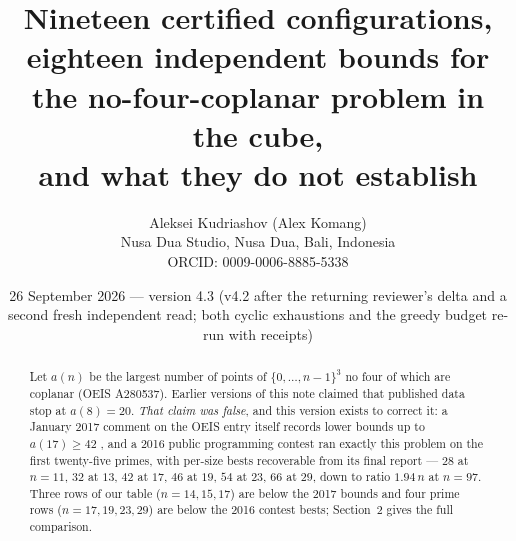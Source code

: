 \documentclass[11pt,a4paper]{article}
\title{Nineteen certified configurations, eighteen independent bounds for the no-four-coplanar problem in the cube,\\
and what they do not establish}
\author{Aleksei Kudriashov (Alex Komang)\\ \small Nusa Dua Studio, Nusa Dua, Bali, Indonesia\\ \small ORCID: 0009-0006-8885-5338}
\date{26 September 2026 --- version 4.3 (v4.2 after the returning reviewer's delta and a second fresh independent read; both cyclic exhaustions and the greedy budget re-run with receipts)}
\begin{document}
\maketitle
\begin{abstract}
Let $a(n)$ be the largest number of points of $\{0,\dots,n-1\}^3$ no four of which are coplanar
(OEIS A280537).  Earlier versions of this note claimed that published data stop at $a(8)=20$.
\emph{That claim was false}, and this version exists to correct it: a January 2017 comment on
the OEIS entry itself records lower bounds up to $a(17)\ge42$ \cite{OEISA280537}, and a 2016
public programming contest ran exactly this problem on the first twenty-five primes, with
per-size bests recoverable from its final report \cite{AZsPCs} --- $28$ at $n=11$, $32$ at $13$,
$42$ at $17$, $46$ at $19$, $54$ at $23$, $66$ at $29$, down to ratio $1.94\,n$ at $n=97$.
Three rows of our table ($n=14,15,17$) are below the 2017 bounds and four prime rows
($n=17,19,23,29$) are below the 2016 contest bests; Section~2 gives the full comparison.


\end{abstract}
\end{document}
